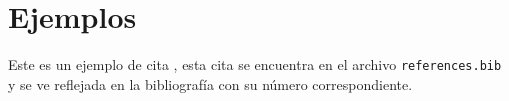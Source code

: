 \section{Ejemplos}

Este es un ejemplo de cita \cite{example}, esta cita se encuentra en el archivo \texttt{references.bib} y se ve reflejada en la bibliografía con su número correspondiente.